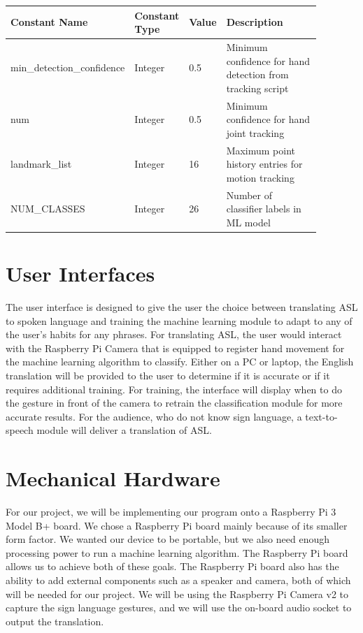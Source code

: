 \documentclass[12pt, titlepage]{article}
\begin{document}
\renewcommand{\arraystretch}{1.2}
\noindent \begin{tabularx}{\textwidth}{p{0.28\linewidth}|p{0.12\linewidth}|p{0.08\linewidth}|p{0.4\linewidth}}
\toprule
\textbf{Constant Name} & \textbf{Constant Type} & \textbf{Value} & \textbf{Description}\\
\midrule
min\_detection\_confidence & Integer & 0.5 & Minimum confidence for hand detection from tracking script\\
\hline
num & Integer & 0.5 & Minimum confidence for hand joint tracking\\
\hline
landmark\_list & Integer & 16 & Maximum point history entries for motion tracking\\
\hline
NUM\_CLASSES & Integer & 26 & Number of classifier labels in ML model\\
\bottomrule
\end{tabularx}

\section{User Interfaces}

The user interface is designed to give the user the choice between translating ASL to spoken language and training the machine learning module to adapt 
to any of the user’s habits for any phrases. For translating ASL, the user would interact with the Raspberry Pi Camera that is equipped to register hand 
movement for the machine learning algorithm to classify. Either on a PC or laptop, the English translation will be provided to the user to determine if 
it is accurate or if it requires additional training. For training, the interface will display when to do the gesture in front of the camera to retrain 
the classification module for more accurate results. For the audience, who do not know sign language, a text-to-speech module will deliver a translation of ASL.

\section{Mechanical Hardware}

For our project, we will be implementing our program onto a Raspberry Pi 3 Model B+ board. We chose a Raspberry Pi board mainly because of its smaller form 
factor. We wanted our device to be portable, but we also need enough processing power to run a machine learning algorithm. The Raspberry Pi board allows us 
to achieve both of these goals. The Raspberry Pi board also has the ability to add external components such as a speaker and camera, both of which will be 
needed for our project. We will be using the Raspberry Pi Camera v2 to capture the sign language gestures, and we will use the on-board audio socket to output 
the translation.
\end{document}
